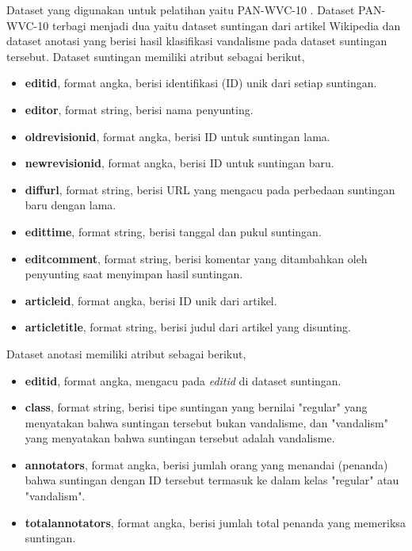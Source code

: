 Dataset yang digunakan untuk pelatihan yaitu PAN-WVC-10
\cite{potthast:2010b}.
Dataset PAN-WVC-10 terbagi menjadi dua yaitu dataset suntingan dari artikel
Wikipedia dan dataset anotasi yang berisi hasil klasifikasi vandalisme pada
dataset suntingan tersebut.
Dataset suntingan memiliki atribut sebagai berikut,

\begin{itemize}
	\item \textbf{editid}, format angka, berisi identifikasi (ID) unik dari setiap suntingan.
	\item \textbf{editor}, format string, berisi nama penyunting.
	\item \textbf{oldrevisionid}, format angka, berisi ID untuk suntingan lama.
	\item \textbf{newrevisionid}, format angka, berisi ID untuk suntingan baru.
	\item \textbf{diffurl}, format string, berisi URL yang mengacu pada perbedaan suntingan baru dengan lama.
	\item \textbf{edittime}, format string, berisi tanggal dan pukul
	suntingan.
	\item \textbf{editcomment}, format string, berisi komentar yang ditambahkan oleh penyunting saat menyimpan hasil suntingan.
	\item \textbf{articleid}, format angka, berisi ID unik dari artikel.
	\item \textbf{articletitle}, format string, berisi judul dari artikel yang disunting.
\end{itemize}

Dataset anotasi memiliki atribut sebagai berikut,

\begin{itemize}
	\item \textbf{editid}, format angka, mengacu pada \textit{editid} di
	dataset suntingan.
	\item \textbf{class}, format string, berisi tipe suntingan yang
	bernilai "regular" yang menyatakan bahwa suntingan tersebut bukan
	vandalisme, dan "vandalism" yang menyatakan bahwa suntingan tersebut
	adalah vandalisme.
	\item \textbf{annotators}, format angka, berisi jumlah orang yang
	menandai (penanda) bahwa suntingan dengan ID tersebut termasuk ke dalam
	kelas "regular" atau "vandalism".
	\item \textbf{totalannotators}, format angka, berisi jumlah total penanda yang memeriksa suntingan.
\end{itemize}

